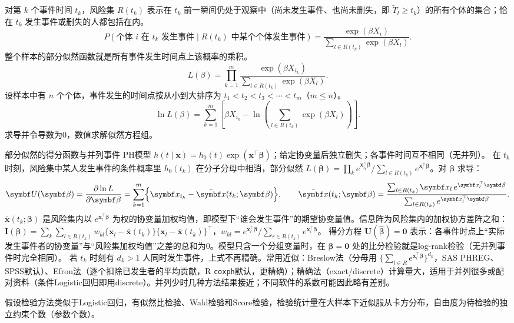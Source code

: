 对第 $k$ 个事件时间 $t_k$，风险集 $R(t_k)$ 表示在 $t_k$ 前一瞬间仍处于观察中（尚未发生事件、也尚未删失，即 $\widetilde T_l\ge t_k$）的所有个体的集合；恰在 $t_k$ 发生事件或删失的人都包括在内。
\[
P(\text{个体 }i\text{ 在 }t_k\text{ 发生事件}\mid R(t_k)\text{ 中某个个体发生事件})
=\frac{\exp(\beta X_i)}{\sum_{l\in R(t_k)}\exp(\beta X_l)}.
\]
整个样本的部分似然函数就是所有事件发生时间点上该概率的乘积。
\[
L(\beta)=\prod_{k=1}^m\frac{\exp(\beta X_{i_k})}{\sum_{l\in R(t_k)}\exp(\beta X_l)}.
\]
设样本中有 $n$ 个个体，事件发生的时间点按从小到大排序为 $t_1<t_2<t_3<\cdots<t_m$（$m\le n$）。
\[
\ln L(\beta)=\sum_{k=1}^m\left[\beta X_{i_k}-\ln\left(\sum_{l\in R(t_k)}\exp(\beta X_l)\right)\right].
\]
求导并令导数为0，数值求解似然方程组。
\begin{derivation}{部分似然的得分函数与并列事件}
PH模型 $h(t\mid\bm x)=h_0(t)\exp(\bm x^\top\bm\beta)$；给定协变量后独立删失；各事件时间互不相同（无并列）。
在 $t_k$ 时刻，风险集中某人发生事件的条件概率里 $h_0(t_k)$ 在分子分母中相消，部分似然 $L(\bm\beta)=\prod_k e^{\bm x_{i_k}^\top\bm\beta}/\sum_{l\in R(t_k)}e^{\bm x_l^\top\bm\beta}$。对 $\bm\beta$ 求导：
\[
\bm U(\bm\beta)=\frac{\partial\ln L}{\partial\bm\beta}=\sum_{k=1}^m\Bigl\{\bm x_{i_k}-\bar{\bm x}(t_k;\bm\beta)\Bigr\},\qquad
\bar{\bm x}(t_k;\bm\beta)=\frac{\sum_{l\in R(t_k)}\bm x_l\,e^{\bm x_l^\top\bm\beta}}{\sum_{l\in R(t_k)}e^{\bm x_l^\top\bm\beta}} .
\]
$\bar{\bm x}(t_k;\bm\beta)$ 是风险集内以 $e^{\bm x_l^\top\bm\beta}$ 为权的协变量加权均值，即模型下“谁会发生事件”的期望协变量值。信息阵为风险集内的加权协方差阵之和：$\bm I(\bm\beta)=\sum_k\sum_{l\in R(t_k)}w_{kl}\{\bm x_l-\bar{\bm x}(t_k)\}\{\bm x_l-\bar{\bm x}(t_k)\}^\top$，$w_{kl}=e^{\bm x_l^\top\bm\beta}/\sum_{r\in R(t_k)}e^{\bm x_r^\top\bm\beta}$。
得分方程 $\bm U(\widehat{\bm\beta})=\bm 0$ 表示：各事件时点上“实际发生事件者的协变量”与“风险集加权均值”之差的总和为0。模型只含一个分组变量时，在 $\bm\beta=\bm 0$ 处的比分检验就是log-rank检验（无并列事件时完全相同）。
若 $t_k$ 时刻有 $d_k>1$ 人同时发生事件，上式不再精确。常用近似：Breslow法（分母用 $\{\sum_{l\in R}e^{\bm x_l^\top\bm\beta}\}^{d_k}$，SAS PHREG、SPSS默认）、Efron法（逐个扣除已发生者的平均贡献，R \texttt{coxph}默认，更精确）；精确法（exact/discrete）计算量大，适用于并列很多或配对资料（条件Logistic回归即用discrete）。并列少时几种方法结果接近；不同软件的系数可能因此略有差别。
\end{derivation}
假设检验方法类似于Logistic回归，有似然比检验、Wald检验和Score检验，检验统计量在大样本下近似服从卡方分布，自由度为待检验的独立约束个数（参数个数）。

